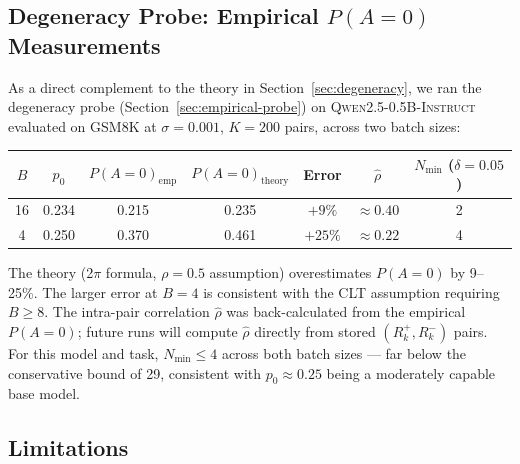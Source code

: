 \documentclass[11pt]{article}
\theoremstyle{definition}
\theoremstyle{remark}
\newcommand{\Nmin}{N_{\mathrm{min}}}
\begin{document}
\subsection{Degeneracy Probe: Empirical $P(A=0)$ Measurements}

As a direct complement to the theory in Section~\ref{sec:degeneracy}, we ran the degeneracy probe (Section~\ref{sec:empirical-probe}) on \textsc{Qwen2.5-0.5B-Instruct} evaluated on GSM8K at $\sigma = 0.001$, $K = 200$ pairs, across two batch sizes:

\begin{center}
\begin{tabular}{ccccccc}
\toprule
$B$ & $p_0$ & $P(A=0)_{\text{emp}}$ & $P(A=0)_{\text{theory}}$ & Error & $\hat\rho$ & $\Nmin$ ($\delta=0.05$)\\
\midrule
16 & 0.234 & 0.215 & 0.235 & $+9\%$ & $\approx 0.40$ & 2\\
4  & 0.250 & 0.370 & 0.461 & $+25\%$ & $\approx 0.22$ & 4\\
\bottomrule
\end{tabular}
\end{center}

The theory (2$\pi$ formula, $\rho = 0.5$ assumption) overestimates $P(A=0)$ by 9--25\%. The larger error at $B=4$ is consistent with the CLT assumption requiring $B \geq 8$. The intra-pair correlation $\hat\rho$ was back-calculated from the empirical $P(A=0)$; future runs will compute $\hat\rho$ directly from stored $(R^+_k, R^-_k)$ pairs. For this model and task, $\Nmin \leq 4$ across both batch sizes --- far below the conservative bound of 29, consistent with $p_0 \approx 0.25$ being a moderately capable base model.

\subsection{Limitations}
\end{document}
